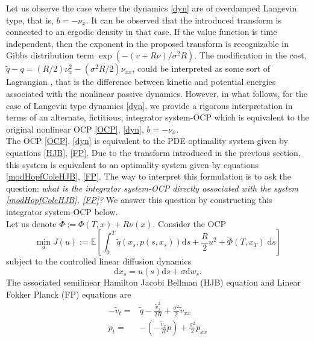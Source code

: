 \documentclass[letterpaper, 12pt]{article}
\newcommand{\rd}{{\mathrm d}}
\newcommand{\Eb}{\mathbb{E}}
\begin{document}
Let us observe the case where the dynamics \eqref{dyn} are of overdamped Langevin type, that is, $b = -\nu_x$. It can be observed that the introduced transform is connected to an ergodic density in that case. If the value function is time independent, then the exponent in the proposed transform is recognizable in Gibbs distribution term $\exp(-(v + R \nu)/\sigma^2 R)$. The modification in the cost, $\tilde{q} - q = (R/2)\nu_x^2 - (\sigma^2R/2) \nu_{xx}$, could be interpreted as  some sort of Lagrangian \cite{Elsgolc1961}, that is the difference between kinetic and potential energies associated with the nonlinear passive dynamics. However, in what follows, for the case of Langevin type dynamics \eqref{dyn}, we provide a rigorous interpretation in terms of an alternate, fictitious, integrator system-OCP which is equivalent to the original nonlinear OCP \eqref{OCP}, \eqref{dyn}, $b = -\nu_x$. \\
\indent The OCP \eqref{OCP}, \eqref{dyn} is equivalent to the PDE optimality system given by equations \eqref{HJB}, \eqref{FP}. Due to the transform introduced in the previous section, this system is equivalent to an optimality system given by equations \eqref{modHopfColeHJB}, \eqref{FP}. The way to interpret this formulation is to ask the question: \textit{what is the integrator system-OCP directly associated with the system \eqref{modHopfColeHJB}, \eqref{FP}?} We answer this question by constructing this integrator system-OCP below. \\
\indent Let us denote $\tilde{\Phi} := \Phi(T,x) + R \nu(x)$. Consider the OCP
\begin{equation}
\underset{u}{\min} J(u) := \Eb \left[ \int_{0}^{T} \tilde{q}(x_s,p(s,x_s)) \rd s + \frac{R}{2}u^2 + \tilde{\Phi}(T,x_T) \; \rd s \right] \label{modOCP}
\end{equation}
subject to the controlled linear diffusion dynamics
\begin{equation}
\rd x_s = u(s) \rd s + \sigma \rd w_s. \label{lindyn}
\end{equation}
The associated semilinear Hamilton Jacobi Bellman (HJB) equation and Linear Fokker Planck (FP) equations are
\begin{align}
-\tilde{v}_t =& \tilde{q} - \frac{\tilde{v}_x^2}{2R} + \frac{\sigma^2}{2} \tilde{v}_{xx} \label{modHJB} \\
p_t =& - (- \frac{\tilde{v}_x}{R}p) + \frac{\sigma^2}{2} p_{xx} \label{modFP}
\end{align}
\end{document}
